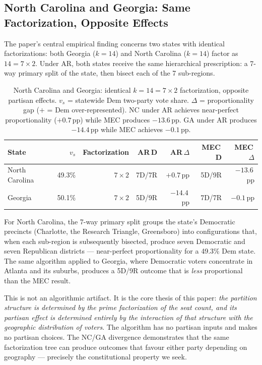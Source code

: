 \subsection{North Carolina and Georgia: Same Factorization, Opposite Effects}
\label{sec:eval:nc-ga}

The paper's central empirical finding concerns two states with identical
factorizations: both Georgia ($k=14$) and North Carolina ($k=14$) factor as
$14 = 7 \times 2$. Under AR, both states receive the same hierarchical
prescription: a 7-way primary split of the state, then bisect each of the 7
sub-regions.

\begin{table}[h]
\centering
\begin{tabular}{lrrrrrr}
\toprule
State & $v_s$ & Factorization & AR\,D & AR\,$\Delta$ & MEC\,D & MEC\,$\Delta$ \\
\midrule
North Carolina & 49.3\% & $7\times 2$ & 7D/7R & $+0.7$\,pp & 5D/9R & $-13.6$\,pp \\
Georgia        & 50.1\% & $7\times 2$ & 5D/9R & $-14.4$\,pp & 7D/7R & $-0.1$\,pp \\
\bottomrule
\end{tabular}
\caption{North Carolina and Georgia: identical $k=14=7\times 2$ factorization,
  opposite partisan effects. $v_s$ = statewide Dem two-party vote share.
  $\Delta$ = proportionality gap ($+$ = Dem over-represented).
  NC under AR achieves near-perfect proportionality ($+0.7$\,pp) while MEC
  produces $-13.6$\,pp. GA under AR produces $-14.4$\,pp while MEC achieves
  $-0.1$\,pp.}
\label{tab:nc-ga}
\end{table}

For North Carolina, the 7-way primary split groups the state's Democratic
precincts (Charlotte, the Research Triangle, Greensboro) into configurations
that, when each sub-region is subsequently bisected, produce seven Democratic
and seven Republican districts --- near-perfect proportionality for a 49.3\%
Dem state. The same algorithm applied to Georgia, where Democratic voters
concentrate in Atlanta and its suburbs, produces a 5D/9R outcome that is
\emph{less} proportional than the MEC result.

This is not an algorithmic artifact. It is the core thesis of this paper:
\emph{the partition structure is determined by the prime factorization of the
seat count, and its partisan effect is determined entirely by the interaction of
that structure with the geographic distribution of voters}. The algorithm has no
partisan inputs and makes no partisan choices. The NC/GA divergence demonstrates
that the same factorization tree can produce outcomes that favour either party
depending on geography --- precisely the constitutional property we seek.

